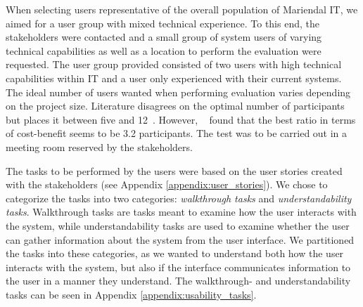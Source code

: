 When selecting users representative of the overall population of Mariendal IT, we aimed for a user group with mixed technical experience. 
To this end, the stakeholders were contacted and a small group of system users of varying technical capabilities as well as a location to perform the evaluation were requested. 
The user group provided consisted of two users with high technical capabilities within IT and a user only experienced with their current systems.
The ideal number of users wanted when performing evaluation varies depending on the project size\cite{NielsenLandauer1993}. 
Literature disagrees on the optimal number of participants but places it between five\cite{virzi_HowManySubjectsIsEnough} and 12~\cite{Hwang_PeopleRequiredForUsabilityEvaluation}.
However, \citeauthor{NielsenLandauer1993}~\cite{NielsenLandauer1993} found that the best ratio in terms of cost-benefit seems to be 3.2 participants.  
The test was to be carried out in a meeting room reserved by the stakeholders. 

The tasks to be performed by the users were based on the user stories created with the stakeholders (see Appendix \ref{appendix:user_stories}).
We chose to categorize the tasks into two categories: \textit{walkthrough tasks} and \textit{understandability tasks}.
Walkthrough tasks are tasks meant to examine how the user interacts with the system, while understandability tasks are used to examine whether the user can gather information about the system from the user interface. 
We partitioned the tasks into these categories, as we wanted to understand both how the user interacts with the system, but also if the interface communicates information to the user in a manner they understand.
The walkthrough- and understandability tasks can be seen in Appendix \ref{appendix:usability_tasks}.

